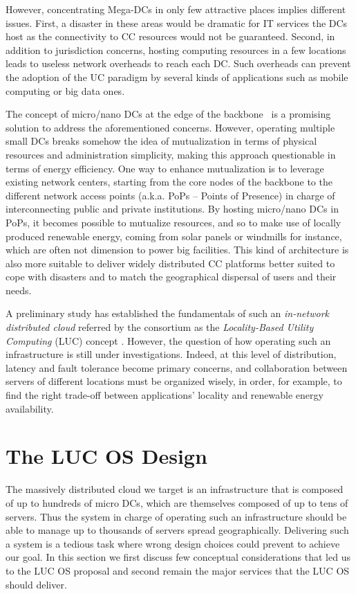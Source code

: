 \documentclass[conference]{IEEEtran}
\begin{document}
However, concentrating Mega-DCs in only few attractive places implies
different issues. First, a disaster 
in these areas would be dramatic for IT services the DCs host as the
connectivity to CC resources would not be guaranteed.
Second,  in addition to jurisdiction concerns, hosting
computing resources in a few locations leads to useless network
overheads to reach each DC. Such overheads can prevent the
adoption of the UC paradigm by several kinds of applications such as mobile
computing or big data ones.

The concept of micro/nano DCs at the edge of the
backbone~\cite{greenberg:2008} is a promising solution to address the
aforementioned concerns. However, operating multiple small DCs breaks
somehow the idea of mutualization in terms of physical resources and
administration simplicity, making this approach questionable in terms
of energy efficiency. One way
to enhance mutualization is to leverage existing network centers,
starting from the core nodes of the backbone to the different network
access points (a.k.a. PoPs – Points of Presence) in charge of
interconnecting public and private institutions.
By hosting micro/nano DCs in PoPs, it becomes possible to mutualize
resources, and so to make use of
locally produced renewable energy, coming from solar panels or windmills 
for instance, which are often not dimension to power big facilities.
This kind of architecture is also more suitable to
deliver widely distributed CC platforms better suited to cope with
disasters and to match the geographical dispersal of users and their
needs.  

A preliminary study has established the fundamentals of such an \emph{in-network
  distributed cloud} referred by the consortium as the \emph{Locality-Based
  Utility Computing} (LUC) concept \cite{lebre:beyond2013}. However, the
question of how operating such an infrastructure is still under investigations.
Indeed, at this level of distribution, latency and fault tolerance become
primary concerns, and collaboration between servers of different locations must
be organized wisely, in order, for example, to find the right trade-off between
applications' locality and renewable energy availability.

\section{The LUC OS Design}
\label{sec:design}
The massively distributed cloud we target is an infrastructure that is composed of up to
hundreds of micro DCs, which are themselves composed of up to tens of servers. Thus the
system in charge of operating such an infrastructure should be able to manage up to
thousands of servers spread geographically. Delivering such a system is a tedious task
where wrong design choices could prevent to achieve our goal.  In this section we first
discuss few conceptual considerations that led us to the LUC OS proposal and second remain
the major services that the LUC OS should deliver.
\end{document}
